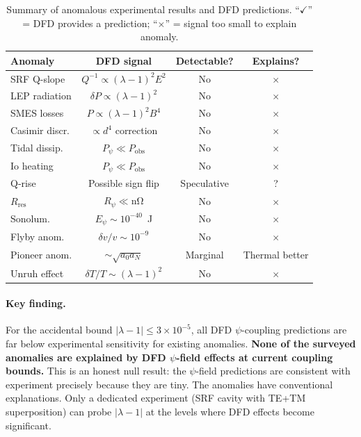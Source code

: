 \documentclass[aps,prd,twocolumn,showpacs,preprintnumbers,superscriptaddress,nofootinbib]{revtex4-2}
\begin{document}
\begin{table}[h]
\caption{Summary of anomalous experimental results and DFD predictions.
``$\checkmark$'' = DFD provides a prediction; ``$\times$'' = signal too
small to explain anomaly.}
\label{tab:anomalies}
\begin{ruledtabular}
\begin{tabular}{lccc}
Anomaly & DFD signal & Detectable? & Explains? \\
\hline
SRF Q-slope & $Q^{-1}\propto(\lambda{-}1)^2 E^2$ & No & $\times$ \\
LEP radiation & $\delta P\propto(\lambda{-}1)^2$ & No & $\times$ \\
SMES losses & $P\propto(\lambda{-}1)^2 B^4$ & No & $\times$ \\
Casimir discr. & $\propto d^4$ correction & No & $\times$ \\
Tidal dissip. & $P_\psi \ll P_{\mathrm{obs}}$ & No & $\times$ \\
Io heating & $P_\psi \ll P_{\mathrm{obs}}$ & No & $\times$ \\
Q-rise & Possible sign flip & Speculative & ? \\
$R_{\mathrm{res}}$ & $R_\psi \ll \mathrm{n\Omega}$ & No & $\times$ \\
Sonolum. & $E_\psi \sim 10^{-40}$~J & No & $\times$ \\
Flyby anom. & $\delta v/v \sim 10^{-9}$ & No & $\times$ \\
Pioneer anom. & $\sim\sqrt{a_0 a_N}$ & Marginal & Thermal better \\
Unruh effect & $\delta T/T\sim(\lambda{-}1)^2$ & No & $\times$ \\
\end{tabular}
\end{ruledtabular}
\end{table}

\paragraph{Key finding.}
For the accidental bound $|\lambda-1| \leq 3\times 10^{-5}$, all
DFD $\psi$-coupling predictions are far below experimental sensitivity
for existing anomalies.  \textbf{None of the surveyed anomalies are
explained by DFD $\psi$-field effects at current coupling bounds.}
This is an honest null result: the $\psi$-field predictions are
consistent with experiment precisely because they are tiny.  The
anomalies have conventional explanations.  Only a dedicated experiment
(SRF cavity with TE+TM superposition) can probe $|\lambda-1|$ at the
levels where DFD effects become significant.
\end{document}
